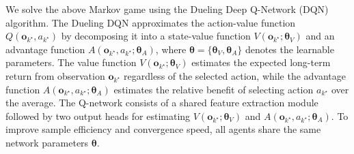 \documentclass[10pt, conference]{IEEEtran}
\begin{document}
We solve the above Markov game using the Dueling Deep Q-Network (DQN) algorithm. The Dueling DQN approximates the action-value function $Q(\mathbf{o}_{k^\star}, a_{k^\star})$ by decomposing it into a state-value function $V\!\left(\mathbf{o}_{k^\star}; \boldsymbol{\theta}_V\right)$ and an advantage function $A\!\left(\mathbf{o}_{k^\star}, a_{k^\star}; \boldsymbol{\theta}_A\right)$,
where $\boldsymbol{\theta} = \{\boldsymbol{\theta}_V, \boldsymbol{\theta}_A\}$ denotes the learnable parameters. The value function $V\!\left(\mathbf{o}_{k^\star}; \boldsymbol{\theta}_V\right)$ estimates the expected long-term return from observation $\mathbf{o}_{k^\star}$ regardless of the selected action, while the advantage function $A\!\left(\mathbf{o}_{k^\star}, a_{k^\star}; \boldsymbol{\theta}_A\right)$ estimates the relative benefit of selecting action $a_{k^\star}$ over the average.
The Q-network consists of a shared feature extraction module followed by two output heads for estimating $V\!\left(\mathbf{o}_{k^\star}; \boldsymbol{\theta}_V\right)$ and $A\!\left(\mathbf{o}_{k^\star}, a_{k^\star}; \boldsymbol{\theta}_A\right)$. To improve sample efficiency and convergence speed, all agents share the same network parameters $\boldsymbol{\theta}$.
\end{document}
